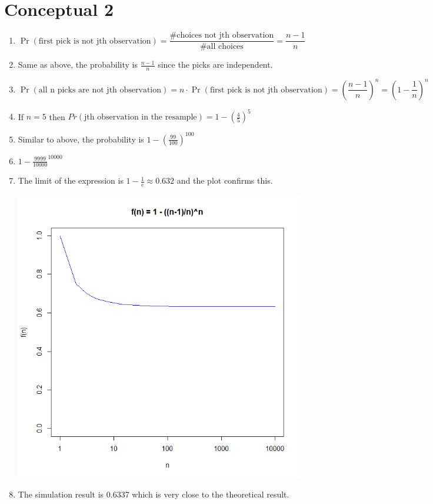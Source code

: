 \documentclass{article}
\begin{document}
\section{Conceptual 2}
\begin{enumerate}[label=(\alph*)]
\item \[\Pr(\text{first pick is not jth observation}) = \frac{\text{\# choices not jth observation}}{\text{\# all choices}} = \frac{n-1}{n}\]
\item Same as above, the probability is $\frac{n-1}{n}$ since the picks are independent.
\item \[\Pr(\text{all n picks are not jth observation}) = n\cdot \Pr(\text{first pick is not jth observation}) = (\frac{n-1}{n})^n = (1- \frac{1}{n})^n\]
\item If \(n=5\) then \(Pr(\text{jth observation in the resample}) = 1 - (\frac{4}{5})^5 \)
\item Similar to above, the probability is \(1 - (\frac{99}{100})^{100}\)
\item \(1- \frac{9999}{10000}^{10000}\)
\item The limit of the expression is \(1 - \frac{1}{e} \approx 0.632 \) and the plot confirms this.

\includegraphics[scale=0.5]{q2-1.png}
\item The simulation result is 0.6337 which is very close to the theoretical result.

\end{enumerate}
\end{document}
